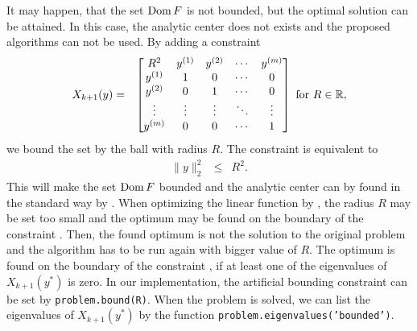 It may happen, that the set $\operatorname{Dom} F$ is not bounded, but the optimal solution can be attained.
In this case, the analytic center does not exists and the proposed algorithms can not be used. 
By adding a constraint 
\begin{eqnarray}
  X_{k+1}(y) &=& \bmB R^2 & y\ind1 & y\ind2 & \cdots & y\ind m\\
                      y\ind1 & 1 & 0 & \cdots & 0\\
                      y\ind2 & 0 & 1 & \cdots & 0\\
                      \vdots & \vdots & \vdots & \ddots & \vdots\\
                      y\ind m & 0 & 0 & \cdots & 1\bmE \text{ for } R\in\R, \labeleq{SDP:imp:bound}
\end{eqnarray}
we bound the set by the ball with radius $R$.
The constraint  is equivalent to
\begin{eqnarray}
  \|y\|_2^2 &\leq&R^2.
\end{eqnarray}
This will make the set $\operatorname{Dom} F$ bounded and the analytic center can by found in the standard way by .
When optimizing the linear function by , the radius $R$ may be set too small and the optimum may be found on the boundary of the constraint .
Then, the found optimum is not the solution to the original problem and the algorithm has to be run again with bigger value of $R$.
The optimum is found on the boundary of the constraint , if at least one of the eigenvalues of $X_{k+1}(y^*)$ is zero.
In our implementation, the artificial bounding constraint  can be set by \texttt{problem.bound(R)}.
When the problem is solved, we can list the eigenvalues of $X_{k+1}(y^*)$ by the function \texttt{problem.eigenvalues('bounded')}.

